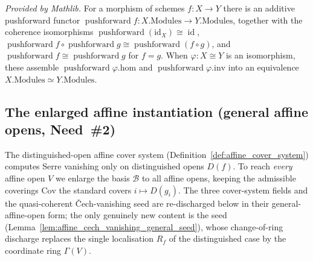 \begin{lemma}
  \label{lem:modules_pushforward_mathlib}
  \mathlibok
  \textit{Provided by Mathlib.}
  For a morphism of schemes \(f : X \to Y\) there is an additive pushforward functor
  \(\operatorname{pushforward} f : X.\mathrm{Modules} \to Y.\mathrm{Modules}\), together with the
  coherence isomorphisms \(\operatorname{pushforward}(\mathrm{id}_X) \cong \operatorname{id}\),
  \(\operatorname{pushforward} f \circ \operatorname{pushforward} g \cong
  \operatorname{pushforward}(f \circ g)\), and \(\operatorname{pushforward} f \cong
  \operatorname{pushforward} g\) for \(f = g\). When \(\varphi : X \cong Y\) is an isomorphism, these
  assemble \(\operatorname{pushforward}\varphi.\mathrm{hom}\) and
  \(\operatorname{pushforward}\varphi.\mathrm{inv}\) into an equivalence
  \(X.\mathrm{Modules} \simeq Y.\mathrm{Modules}\).
\end{lemma}

\subsection{The enlarged affine instantiation (general affine opens, Need~\#2)}

The distinguished-open affine cover system (Definition~\ref{def:affine_cover_system}) computes Serre
vanishing only on distinguished opens \(D(f)\). To reach \emph{every} affine open \(V\) we enlarge the
basis \(\mathcal{B}\) to all affine opens, keeping the admissible coverings \(\mathrm{Cov}\) the standard
covers \(i \mapsto D(g_i)\). The three cover-system fields and the quasi-coherent {\v C}ech-vanishing seed
are re-discharged below in their general-affine-open form; the only genuinely new content is the seed
(Lemma~\ref{lem:affine_cech_vanishing_general_seed}), whose change-of-ring discharge replaces the single
localisation \(R_f\) of the distinguished case by the coordinate ring \(\Gamma(V)\).

